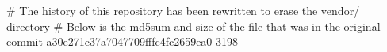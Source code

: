 # The history of this repository has been rewritten to erase the vendor/ directory
# Below is the md5sum and size of the file that was in the original commit
a30e271c37a7047709fffc4fc2659ea0
3198
